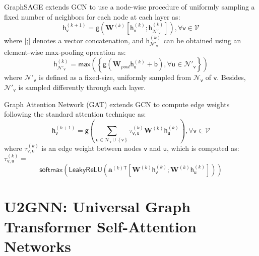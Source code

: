 \documentclass[twoside,leqno,twocolumn]{article}
\newcommand{\citep}{\cite}
\begin{document}
GraphSAGE \citep{hamilton2017inductive} extends GCN to use a node-wise procedure of uniformly sampling a fixed number of neighbors for each node at each layer as:
\begin{equation}
\boldsymbol{\mathsf{h}}_{\mathsf{v}}^{(k+1)} = \mathsf{g}\left(\textbf{W}^{(k)}\left[\boldsymbol{\mathsf{h}}_{\mathsf{v}}^{(k)};\boldsymbol{\mathsf{h}}_{\mathcal{N}'_\mathsf{v}}^{(k)}\right]\right) , \forall \mathsf{v} \in \mathcal{V}
\label{equa:GraphSAGE1}
\end{equation}
where [;] denotes a vector concatenation, and $\boldsymbol{\mathsf{h}}_{\mathcal{N}'_\mathsf{v}}^{(k)}$ can be obtained using an element-wise max-pooling operation as:
\begin{equation}
\boldsymbol{\mathsf{h}}_{\mathcal{N}'_\mathsf{v}}^{(k)} = \mathsf{max}\left(\left\{\mathsf{g}\left(\textbf{W}_{pool}\boldsymbol{\mathsf{h}}_{\mathsf{u}}^{(k)} + \boldsymbol{\mathsf{b}}\right), \forall \mathsf{u} \in \mathcal{N}'_\mathsf{v}\right\}\right)
\label{equa:GraphSAGE3}
\end{equation}
where $\mathcal{N}'_\mathsf{v}$ is defined as a fixed-size, uniformly sampled from $\mathcal{N}_\mathsf{v}$ of $\mathsf{v}$. Besides, $\mathcal{N}'_\mathsf{v}$ is sampled differently through each layer.

Graph Attention Network (GAT) \citep{velickovic2018graph} extends GCN to compute edge weights following the standard attention technique \citep{bahdanau2014neural} as:
\begin{equation}
\boldsymbol{\mathsf{h}}^{(k+1)}_{\mathsf{v}} = \mathsf{g}\left(\sum_{\mathsf{u} \in \mathcal{N}_\mathsf{v}\cup\left\{\mathsf{v}\right\}}\tau^{(k)}_{\mathsf{v},\mathsf{u}}\textbf{W}^{(k)}\boldsymbol{\mathsf{h}}^{(k)}_{\mathsf{u}}\right) , \forall \mathsf{v} \in \mathcal{V}
\label{equa:gat1}
\end{equation}
where $\tau^{(k)}_{\mathsf{v},\mathsf{u}}$ is an edge weight between nodes $\mathsf{v}$ and $\mathsf{u}$, which is computed as: 
$\tau^{(k)}_{\mathsf{v},\mathsf{u}} =$
\begin{equation}
\mathsf{softmax}\left(\mathsf{LeakyReLU}\left(\boldsymbol{a}^{(k)\mathsf{T}}\left[\textbf{W}^{(k)}\boldsymbol{\mathsf{h}}^{(k)}_{\mathsf{v}}; \textbf{W}^{(k)}\boldsymbol{\mathsf{h}}^{(k)}_{\mathsf{u}}\right]\right)\right)
\label{equa:gat2}
\end{equation}



\section{U2GNN: Universal Graph Transformer Self-Attention Networks}
\label{sec:ourmodel}
\end{document}

